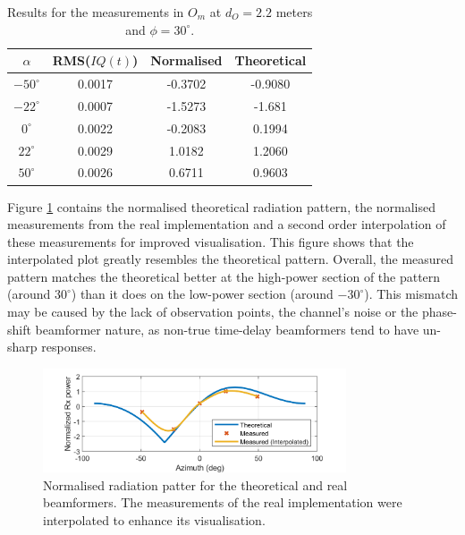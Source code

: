 \documentclass[12pt,a4paper]{report}
\begin{document}
\begin{table}[h]
    \centering
    \begin{tabular}{c|c|c||c}
        $\alpha$ & RMS($IQ(t)$) & Normalised & Theoretical\\ \hline
        $-50^\circ$ & 0.0017 & -0.3702 & -0.9080\\
        $-22^\circ$ & 0.0007 & -1.5273 & -1.681\\
        $0^\circ$ & 0.0022 & -0.2083 & 0.1994\\
        $22^\circ$ & 0.0029 & 1.0182 & 1.2060\\
        $50^\circ$ & 0.0026 & 0.6711 & 0.9603\\
    \end{tabular}
    \caption[Results of the TX beamforming test.]{Results for the measurements in $O_m$ at $d_O = 2.2$ meters and $\phi = 30^\circ$.}
    \label{tab:test:bf:tx}
\end{table}

Figure \ref{fig:test:bf:tx:pattern} contains the normalised theoretical radiation pattern, the normalised measurements from the real implementation and a second order interpolation of these measurements for improved visualisation. This figure shows that the interpolated plot greatly resembles the theoretical pattern. Overall, the measured pattern matches the theoretical better at the high-power section of the pattern (around $30^\circ$) than it does on the low-power section (around $-30^\circ$). This mismatch may be caused by the lack of observation points, the channel's noise or the phase-shift beamformer nature, as non-true time-delay beamformers tend to have un-sharp responses.

\begin{figure}[h]
    \centering
    \includegraphics[width = 0.8\textwidth]{Figures/test_bf_tx_pattern.png}
    \caption[Normalised radiation patter for the theoretical and real beamformers.]{Normalised radiation patter for the theoretical and real beamformers. The measurements of the real implementation were interpolated to enhance its visualisation.}
    \label{fig:test:bf:tx:pattern}
\end{figure}
\end{document}
